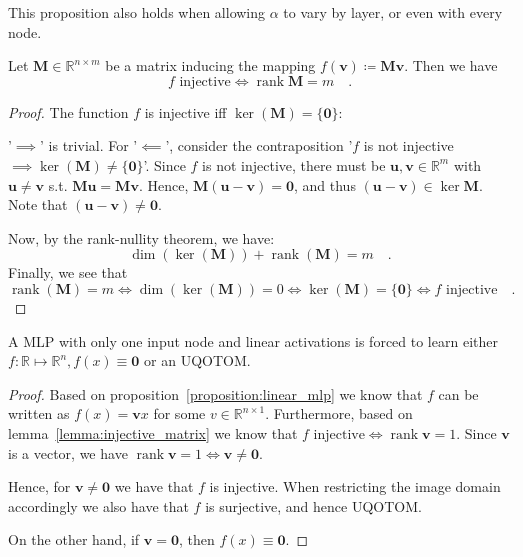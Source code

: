 \documentclass[../../main.tex]{subfiles}
\begin{document}
    \begin{remark}
        This proposition also holds when allowing $\alpha$ to vary by layer, or even with every node.
    \end{remark}

    \begin{lemma}
        \label{lemma:injective_matrix}
        Let $\bm{M} \in \mathbb{R}^{n \times m}$ be a matrix inducing the mapping $f(\bm{v}) \coloneqq \bm{Mv}$. Then we have
        \[
            f \text{ injective} \iff \operatorname{rank} \bm{M} = m \quad .
        \]
    \end{lemma}
    \begin{proof}
        The function $f$ is injective iff $\ker(\bm{M}) = \{\bm{0}\}$:
        
        '$\implies$' is trivial. For '$\impliedby$', consider the contraposition '$f$ is not injective $\implies \ker(\bm{M}) \neq \{\bm{0}\}$'. Since $f$ is not injective, there must be $\bm{u}, \bm{v} \in \mathbb{R}^m$ with $\bm{u} \neq \bm{v}$ s.t. $\bm{Mu} = \bm{Mv}$. Hence, $\bm{M}(\bm{u}-\bm{v}) = \bm{0}$, and thus $(\bm{u}-\bm{v}) \in \ker{\bm{M}}$. Note that $(\bm{u}-\bm{v}) \neq \bm{0}$.

        Now, by the rank-nullity theorem, we have:
        \[
        \dim(\ker(\bm{M})) + \operatorname{rank}(\bm{M}) = m \quad .
        \]
        Finally, we see that
        \[
            \operatorname{rank}(\bm{M}) = m \iff \dim(\ker(\bm{M})) = 0 \iff \ker(\bm{M}) = \{\bm{0}\} \iff f \text{ injective} \quad .
        \]
    \end{proof}

    \begin{corollary}
        A MLP with only one input node and linear activations is forced to learn either $f: \mathbb{R} \mapsto \mathbb{R}^n, f(x) \equiv \bm{0}$ or an UQOTOM.
    \end{corollary}
    \begin{proof}
        Based on proposition~\ref{proposition:linear_mlp} we know that $f$ can be written as $f(x) = \bm{v} x$ for some $v \in \mathbb{R}^{n \times 1}$. Furthermore, based on lemma~\ref{lemma:injective_matrix} we know that $f \text{ injective} \iff \operatorname{rank}\bm{v} = 1$. Since $\bm{v}$ is a vector, we have $\operatorname{rank}\bm{v} = 1 \iff \bm{v} \neq \bm{0}$.

        Hence, for $\bm{v} \neq \bm{0}$ we have that $f$ is injective. When restricting the image domain accordingly we also have that $f$ is surjective, and hence UQOTOM.

        On the other hand, if $\bm{v} = \bm{0}$, then $f(x) \equiv \bm{0}$.
    \end{proof}
\end{document}
